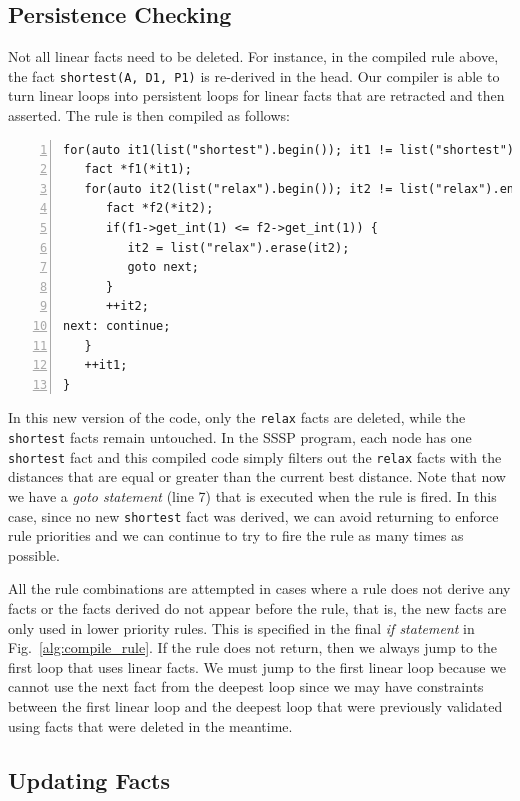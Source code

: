 \subsection{Persistence Checking}

Not all linear facts need to be deleted. For instance, in the compiled rule
above, the fact \texttt{shortest(A, D1, P1)} is re-derived in the head. Our
compiler is able to turn linear loops into persistent loops for linear facts
that are retracted and then asserted.  The rule is then compiled as follows:

\begin{Verbatim}[numbers=left,fontsize=\scriptsize,xleftmargin=\codemargin]
for(auto it1(list("shortest").begin()); it1 != list("shortest").end(); ) {
   fact *f1(*it1);
   for(auto it2(list("relax").begin()); it2 != list("relax").end(); ) {
      fact *f2(*it2);
      if(f1->get_int(1) <= f2->get_int(1)) {
         it2 = list("relax").erase(it2);
         goto next;
      }
      ++it2;
next: continue;
   }
   ++it1;
}
\end{Verbatim}

In this new version of the code, only the \texttt{relax} facts are deleted,
while the \texttt{shortest} facts remain untouched. In the SSSP program, each
node has one \texttt{shortest} fact and this compiled code simply filters out
the \texttt{relax} facts with the distances that are equal or greater than the
current best distance. Note that now we have a \emph{goto statement} (line 7)
that is executed when the rule is fired.  In this case, since no new
\texttt{shortest} fact was derived, we can avoid returning to enforce rule
priorities and we can continue to try to fire the rule as many times as
possible.

All the rule combinations are attempted in cases where a rule does not derive
any facts or the facts derived do not appear before the rule, that is, the new
facts are only used in lower priority rules. This is specified in the final
\emph{if statement} in Fig.~\ref{alg:compile_rule}. If the rule does not return,
then we always jump to the first loop that uses linear facts. We must jump to
the first linear loop because we cannot use the next fact from the deepest loop
since we may have constraints between the first linear loop and the deepest loop
that were previously validated using facts that were deleted in the meantime.

\subsection{Updating Facts}

